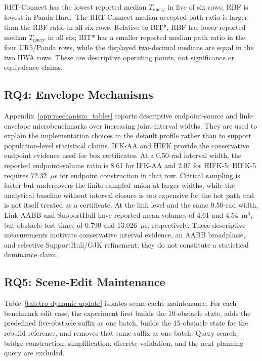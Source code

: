 \documentclass[journal]{IEEEtran}
\newcommand{\rbf}{RBF}
\newcommand{\Tquery}{\ensuremath{T_{\mathrm{query}}}}
\begin{document}
RRT-Connect has the lowest reported median $\Tquery$ in five of six rows;
\rbf{} is lowest in Panda-Hard. The RRT-Connect median accepted-path ratio is
larger than the \rbf{} ratio in all six rows. Relative to BIT*, \rbf{} has lower
reported median $\Tquery$ in all six; BIT* has a smaller reported median path
ratio in the four UR5/Panda rows, while the displayed two-decimal medians are
equal in the two IIWA rows. These are descriptive operating points, not
significance or equivalence claims.

\subsection{RQ4: Envelope Mechanisms}\label{sec:exp_mechanisms}

Appendix~\ref{app:mechanism_tables} reports descriptive endpoint-source and
link-envelope microbenchmarks over increasing joint-interval widths. They are
used to explain the implementation choices in the default profile rather than
to support population-level statistical claims. IFK-AA and HIFK provide the
conservative endpoint evidence used for box certificates. At a 0.50-rad interval
width, the reported endpoint-volume ratio is 8.61 for IFK-AA and 2.07 for
HIFK-5; HIFK-5 requires 72.32~$\mu$s for endpoint construction in that row.
Critical sampling is faster but undercovers the finite sampled union at larger
widths, while the analytical baseline without interval closure is too
expensive for the hot path and is not itself treated as a certificate. At the link level and the same
0.50-rad width, Link AABB and SupportHull have reported mean volumes of 4.61 and
4.54~m$^3$, but obstacle-test times of 0.790 and 13.026~$\mu$s, respectively.
These descriptive measurements motivate conservative interval evidence, an AABB
broadphase, and selective SupportHull/GJK refinement; they do not constitute a
statistical dominance claim.

\subsection{RQ5: Scene-Edit Maintenance}\label{sec:exp_dynamic_updates}

Table~\ref{tab:tro-dynamic-update} isolates scene-cache maintenance. For each
benchmark edit case, the experiment first builds the 10-obstacle state, adds the
predefined five-obstacle suffix as one batch, builds the 15-obstacle state for the
rebuild reference, and removes that same suffix as one batch. Query search,
bridge construction, simplification, discrete validation, and the next planning
query are excluded.
\end{document}
